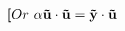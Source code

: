 \documentclass[preview]{standalone}
\begin{document}
\begin{align*}
{\textbf[Or} \,\, \mathbf{\alpha} \mathbf{\vec{u}} \cdot \mathbf{\vec{u}} = \mathbf{\vec{y}} \cdot \mathbf{\vec{u}}
\end{align*}
\end{document}
